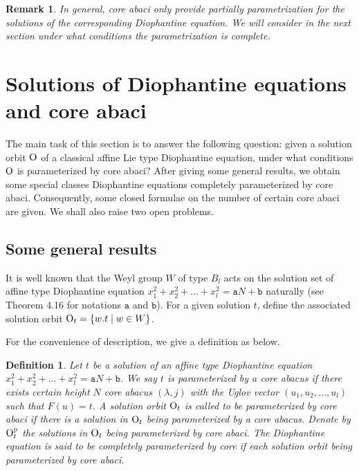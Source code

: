 \documentclass[11pt]{amsart}
\theoremstyle{plain}
\numberwithin{equation}{subsection}
\newtheorem{definition}[theorem]{Definition}
\newtheorem{remark}[theorem]{Remark}
\newcommand{\lam}{\lambda}
\begin{document}
\begin{remark}\rm{
In general, core abaci only provide partially parametrization for the solutions of the corresponding Diophantine equation.
We will consider in the next section under what conditions the parametrization is complete.}
\end{remark}

\bigskip


\section{Solutions of Diophantine equations and core abaci}

The main task of this section is to answer the following question: 
given a solution orbit $\rm O$ of a classical affine Lie type Diophantine equation, 
under what conditions $\rm O$ is parameterized by core abaci? After giving some general results, 
we obtain some special classes Diophantine equations completely parameterized by core abaci.
Consequently, some closed formulae on the number of certain core abaci are given.
We shall also raise two open problems. 

\subsection{Some general results}
It is well known that the Weyl group $W$ of type $B_l$ acts on the solution set of affine type 
Diophantine equation $x_1^2+x_2^2+\dots+x_l^2=\mathtt{a}N+\mathtt{b}$ naturally 
(see Theorem 4.16 for notations $\mathtt{a}$ and $\mathtt{b}$). For a given solution $t$, 
define the associated solution orbit ${\rm O}_t=\{w.t\mid w\in W\}$.

For the convenience of description, we give a definition as below.
\begin{definition}
Let $t$ be a solution of an affine type Diophantine equation $x_1^2+x_2^2+\dots+x_l^2=\mathtt{a}N+\mathtt{b}.$ We say $t$ is parameterized by a core abacus if
there exists certain height $N$ core abacus $(\lam, j)$ with the Uglov vector $(u_1, u_2, \dots, u_l)$ such that $F(u)=t$.
A solution orbit ${\rm O}_t$ is called to be parameterized by core abaci if there is a solution in ${\rm O}_t$ being parameterized by a core abacus.
Denote by ${\rm O}^{\rm p}_t$ the solutions in ${\rm O}_t$ being parameterized by core abaci.
The Diophantine equation is said to be completely parameterized by core if each solution orbit being parameterized by core abaci.
\end{definition}
\end{document}
